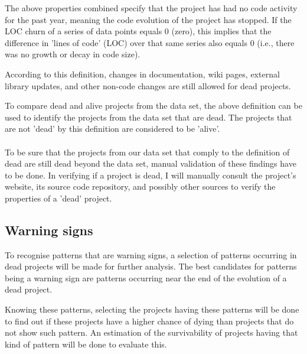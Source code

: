 \noindent
The above properties combined specify that the project has had no code activity
for the past year, meaning the code evolution of the project has stopped. If the
LOC churn of a series of data points equals 0 (zero), this implies that the
difference in 'lines of code' (LOC) over that same series also equals 0 (i.e.,
there was no growth or decay in code size).

According to this definition, changes in documentation, wiki pages, external
library updates, and other non-code changes are still allowed for dead
projects.

To compare dead and alive projects from the data set, the above definition can
be used to identify the projects from the data set that are dead. The projects
that are not 'dead' by this definition are considered to be 'alive'.

\paragraph{}
To be sure that the projects from our data set that comply to the definition of
dead are still dead beyond the data set, manual validation of these findings
have to be done. In verifying if a project is dead, I will manually consult the
project's website, its source code repository, and possibly other sources to
verify the properties of a 'dead' project.

\subsection{Warning signs}
To recognise patterns that are warning signs, a selection of patterns occurring
in dead projects will be made for further analysis. The best candidates for
patterns being a warning sign are patterns occurring near the end of the
evolution of a dead project.

Knowing these patterns, selecting the projects having these patterns will be
done to find out if these projects have a higher chance of dying than projects
that do not show such pattern. An estimation of the survivability of projects
having that kind of pattern will be done to evaluate this.

